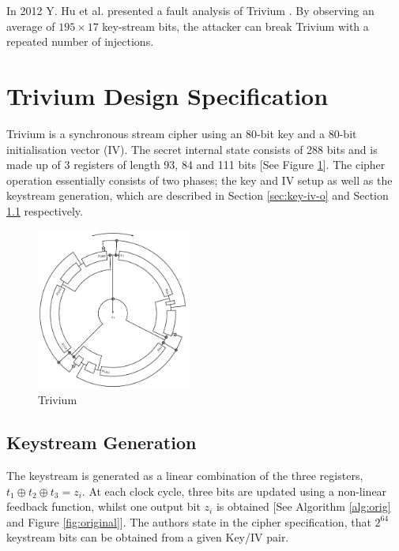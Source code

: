 \documentclass[conference]{IEEEtran}
\begin{document}
In 2012 Y. Hu et al. presented a fault analysis of Trivium \cite{Hu2012}. By observing an average of $195 \times 17$ key-stream bits, the attacker can break Trivium with a repeated number of injections. 

\section{Trivium Design Specification}\label{sec:spec}

Trivium is a synchronous stream cipher using an 80-bit key and a 80-bit initialisation vector (IV). The secret internal state consists of 288 bits and is made up of 3 registers of length 93, 84 and 111 bits [See Figure \ref{fig:circle}]. The cipher operation essentially consists of two phases; the key and IV setup as well as the keystream generation, which are described in Section \ref{sec:key-iv-o} and Section \ref{sec:key-gen-o} respectively.

\begin{figure}[H]
\centering
\includegraphics[width=0.45\textwidth]{figures/round.png}
\caption{Trivium \cite{circle}}
\label{fig:circle}
\end{figure}

\subsection{Keystream Generation}\label{sec:key-gen-o}
The keystream is generated as a linear combination of the three registers, $t_1\oplus t_2\oplus t_3=z_i$. At each clock cycle, three bits are updated using a non-linear feedback function, whilst one output bit $z_i$ is obtained [See Algorithm \ref{alg:orig} and Figure \ref{fig:original}]. The authors state in the cipher specification, that $2^{64}$ keystream bits can be obtained from a given Key/IV pair.
\end{document}
